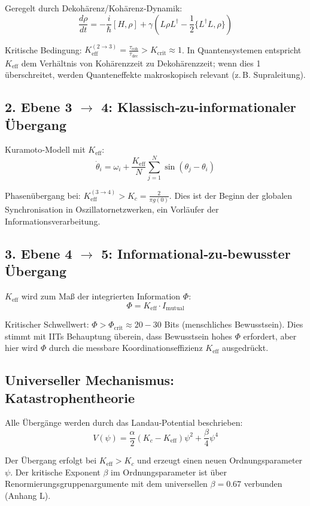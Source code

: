 \documentclass[12pt,a4paper]{article}
\newcommand{\eff}{\mathrm{eff}}
\newcommand{\Ke}{K_{\eff}}
\newcommand{\Kcrit}{K_{\mathrm{crit}}}
\begin{document}
	Geregelt durch Dekohärenz/Kohärenz‑Dynamik:
	\[
	\frac{d\rho}{dt} = -\frac{i}{\hbar}[H,\rho] + \gamma\left(L\rho L^\dagger - \frac{1}{2}\{L^\dagger L,\rho\}\right)
	\]
	
	Kritische Bedingung: $\Ke^{(2\to3)} = \frac{\tau_{\text{coh}}}{\tau_{\text{dec}}} > \Kcrit \approx 1$. In Quantensystemen entspricht $\Ke$ dem Verhältnis von Kohärenzzeit zu Dekohärenzzeit; wenn dies 1 überschreitet, werden Quanteneffekte makroskopisch relevant (z. B. Supraleitung).
	
	\subsection{2. Ebene 3 $\to$ 4: Klassisch‑zu‑informationaler Übergang}
	
	Kuramoto‑Modell mit $\Ke$:
	\[
	\dot{\theta}_i = \omega_i + \frac{\Ke}{N}\sum_{j=1}^N \sin(\theta_j - \theta_i)
	\]
	
	Phasenübergang bei: $\Ke^{(3\to4)} > K_c = \frac{2}{\pi g(0)}$. Dies ist der Beginn der globalen Synchronisation in Oszillatornetzwerken, ein Vorläufer der Informationsverarbeitung.
	
	\subsection{3. Ebene 4 $\to$ 5: Informational‑zu‑bewusster Übergang}
	
	$\Ke$ wird zum Maß der integrierten Information $\Phi$:
	\[
	\Phi = \Ke \cdot I_{\text{mutual}}
	\]
	
	Kritischer Schwellwert: $\Phi > \Phi_{\text{crit}} \approx 20-30$ Bits (menschliches Bewusstsein). Dies stimmt mit IITs Behauptung überein, dass Bewusstsein hohes $\Phi$ erfordert, aber hier wird $\Phi$ durch die messbare Koordinationseffizienz $\Ke$ ausgedrückt.
	
	\subsection{Universeller Mechanismus: Katastrophentheorie}
	
	Alle Übergänge werden durch das Landau‑Potential beschrieben:
	\[
	V(\psi) = \frac{\alpha}{2}(K_c - \Ke)\psi^2 + \frac{\beta}{4}\psi^4
	\]
	
	Der Übergang erfolgt bei $\Ke > K_c$ und erzeugt einen neuen Ordnungsparameter $\psi$. Der kritische Exponent $\beta$ im Ordnungsparameter ist über Renormierungsgruppenargumente mit dem universellen $\beta = 0.67$ verbunden (Anhang L).
	
\end{document}
